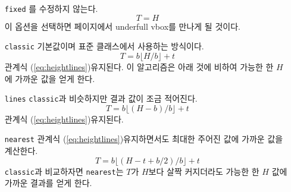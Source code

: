 \begin{itemize}
\item[\texttt{fixed}] 
\lnc{\textheight}를 수정하지 않는다.
\begin{equation} T = H \end{equation}
이 옵션을 선택하면 \cmd{\flushbottom} 페이지에서 underfull vbox를
만나게 될 것이다.

\item[\texttt{classic}] 
기본값이며 표준 클래스에서 사용하는 방식이다.
\begin{equation} T = b \lfloor H/b \rfloor + t \end{equation}
관계식 (\ref{eq:heightlines})\가 유지된다. 이 알고리즘은 아래 것에 비하여
가능한 한 $H$에 가까운 값을 얻게 한다.
\item[\texttt{lines}] 
\texttt{classic}과 비슷하지만 결과 값이 조금 적어진다.
\begin{equation} T = b \lfloor (H-b)/b \rfloor + t \end{equation}
관계식 (\ref{eq:heightlines})\는 유지된다.
\item[\texttt{nearest}] 
관계식 (\ref{eq:heightlines})\를 유지하면서도 최대한 주어진 값에 가까운 값을
계산한다.
\begin{equation} 
  T = b \lfloor (H - t + b/2)/b \rfloor +  t 
\end{equation} 
\texttt{classic}과 비교하자면 \texttt{nearest}는 $T$가 $H$보다 살짝
커지더라도 가능한 한 $H$ 값에 가까운 결과를 얻게 한다.
\end{itemize}

